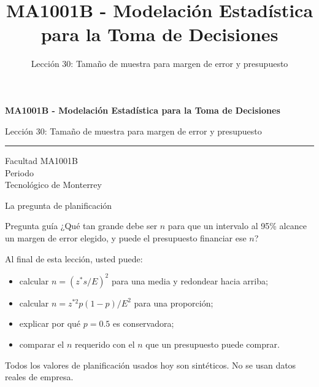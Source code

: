 \documentclass[aspectratio=169,10pt,spanish]{beamer}
\title{MA1001B - Modelación Estadística para la Toma de Decisiones}
\subtitle{Lección 30: Tamaño de muestra para margen de error y presupuesto}
\author{}
\institute{Tecnol\'ogico de Monterrey}
\date{}
\begin{document}
\begin{frame}[plain]
  \vspace{1.2cm}
  {\Large\bfseries MA1001B - Modelación Estadística para la Toma de Decisiones\par}
  \vspace{0.7cm}
  {\large Lección 30: Tamaño de muestra para margen de error y presupuesto\par}
  \vspace{0.7cm}
  {\color{TecRojo}\rule{\textwidth}{1.2pt}}
  \vspace{0.8cm}

  Facultad MA1001B\\[0.3cm]
  Periodo\\[0.3cm]
  Tecnol\'ogico de Monterrey
\end{frame}

\begin{frame}{La pregunta de planificación}
  \begin{alertblock}{Pregunta guía}
    ¿Qué tan grande debe ser $n$ para que un intervalo al 95\% alcance un
    margen de error elegido, y puede el presupuesto financiar ese $n$?
  \end{alertblock}

  \vspace{0.6em}
  Al final de esta lección, usted puede:
  \begin{itemize}
    \item calcular $n=(z^{*}s/E)^{2}$ para una media y redondear hacia arriba;
    \item calcular $n=z^{*2}p(1-p)/E^{2}$ para una proporción;
    \item explicar por qué $p=0.5$ es conservadora;
    \item comparar el $n$ requerido con el $n$ que un presupuesto puede comprar.
  \end{itemize}

  \vfill
  \scriptsize Todos los valores de planificación usados hoy son sintéticos. No se usan datos reales de empresa.
\end{frame}
\end{document}
